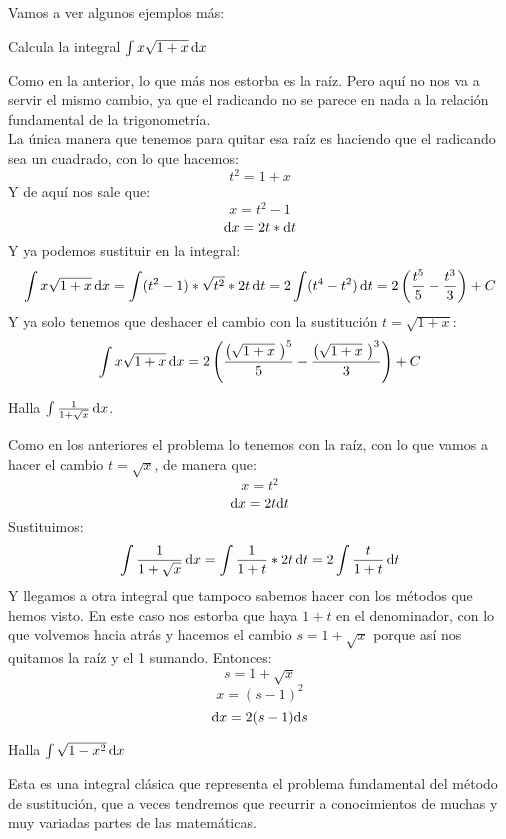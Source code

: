 \documentclass[a4paper,11pt,answers]{exam}
\begin{document}
Vamos a ver algunos ejemplos más:
\begin{questions}
\question Calcula la integral $\int x \sqrt{1 + x}\,\mathrm{d}x$
\begin{solution}
Como en la anterior, lo que más nos estorba es la raíz. Pero aquí no nos va a servir el mismo cambio, ya que el radicando no se parece en nada a la relación fundamental de la trigonometría.\\
La única manera que tenemos para quitar esa raíz es haciendo que el radicando sea un cuadrado, con lo que hacemos:
\[t^2 = 1 + x\]
Y de aquí nos sale que:
\[x = t^2 - 1\]
\[\mathrm{d}x = 2t*\mathrm{d}t\]
Y ya podemos sustituir en la integral:
\[\int x \sqrt{1 + x}\,\mathrm{d}x = \int (t^2 - 1) *\sqrt{t^2}*2t\,\mathrm{d}t = 2 \int (t^4 - t^2)\,\mathrm{d}t = 
2 \left(\frac{t^5}{5} - \frac{t^3}{3}\right) + C\]
Y ya solo tenemos que deshacer el cambio con la sustitución $t = \sqrt{1 + x}$:
\[\int x \sqrt{1 + x}\,\mathrm{d}x = 2 \left(\frac{\left(\sqrt{1 + x}\ \right)^5}{5} - \frac{\left(\sqrt{1 + x}\ \right)^3}{3}\right) + C\]
\end{solution}

\question Halla $\int \frac{1}{1 + \sqrt{x}}\,\mathrm{d}x$.
\begin{solution}
Como en los anteriores el problema lo tenemos con la raíz, con lo que vamos a hacer el cambio $t = \sqrt{x}$, de manera que:
\[x = t^2\]
\[\mathrm{d}x = 2t\mathrm{d}t\]
Sustituimos:
\[\int \frac{1}{1 + \sqrt{x}}\,\mathrm{d}x = \int \frac{1}{1 + t} * 2t\,\mathrm{d}t =2\int \frac{t}{1+t}\,\mathrm{d}t\]
Y llegamos a otra integral que tampoco sabemos hacer con los métodos que hemos visto. En este caso nos estorba que haya $1 + t$ en el denominador, con lo que volvemos hacia atrás y hacemos el cambio $s = 1+\sqrt{x}$ porque así nos quitamos la raíz y el 1 sumando. Entonces:
\[s = 1 +\sqrt{x}\]
\[x = (s - 1)^2\]
\[\mathrm{d}x = 2(s-1)\mathrm{d}s\]
\end{solution}

\question Halla $\int \sqrt{1 - x^2}\,\mathrm{d}x$
\begin{solution}
Esta es una integral clásica que representa el problema fundamental del método de sustitución, que a veces tendremos que recurrir a conocimientos de muchas y muy variadas partes de las matemáticas.\\


\end{solution}
\end{questions}
\end{document}
